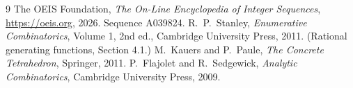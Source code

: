 \documentclass[11pt,a4paper]{article}
\theoremstyle{plain}
\theoremstyle{definition}
\begin{document}
\begin{thebibliography}{9}
 The OEIS Foundation, \emph{The On-Line Encyclopedia of Integer
Sequences}, \url{https://oeis.org}, 2026. Sequence A039824.
 R.~P.~Stanley, \emph{Enumerative Combinatorics}, Volume 1, 2nd ed.,
Cambridge University Press, 2011. (Rational generating functions, Section 4.1.)
 M.~Kauers and P.~Paule, \emph{The Concrete Tetrahedron}, Springer, 2011.
 P.~Flajolet and R.~Sedgewick, \emph{Analytic Combinatorics}, Cambridge
University Press, 2009.
\end{thebibliography}
\end{document}
